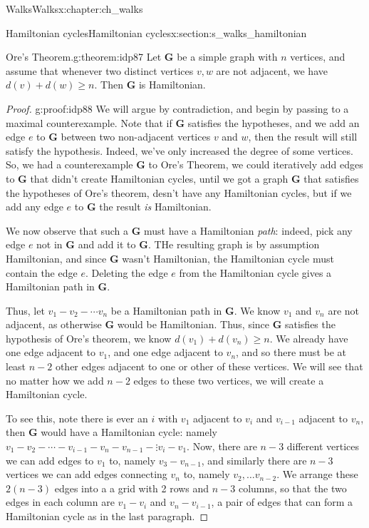 \documentclass[oneside,10pt,]{book}
\numberwithin{equation}{section}
\newcommand{\bfG}{\mathbf{G}}
\begin{document}
\begin{chapterptx}{Walks}{}{Walks}{}{}{x:chapter:ch_walks}
\begin{sectionptx}{Hamiltonian cycles}{}{Hamiltonian cycles}{}{}{x:section:s_walks_hamiltonian}
\begin{theorem}{Ore's Theorem.}{}{g:theorem:idp87}%
Let \(\bfG\) be a simple graph with \(n\) vertices, and assume that whenever two distinct vertices \(v,w\) are not adjacent, we have \(d(v)+d(w)\geq n\).  Then \(\bfG\) is Hamiltonian.%
\end{theorem}
\begin{proof}{}{g:proof:idp88}
We will argue by contradiction, and begin by passing to a maximal counterexample.  Note that if \(\bfG\) satisfies the hypotheses, and we add an edge \(e\) to \(\bfG\) between two non-adjacent vertices \(v\) and \(w\), then the result will still satisfy the hypothesis.  Indeed, we've only increased the degree of some vertices.  So, we had a counterexample \(\bfG\) to Ore's Theorem, we could iteratively add edges to \(\bfG\) that didn't create Hamiltonian cycles, until we got a graph \(\bfG\) that satisfies the hypotheses of Ore's theorem, desn't have any Hamiltonian cycles, but if we add any edge \(e\) to \(\bfG\) the result \emph{is} Hamiltonian.%
\par
We now observe that such a \(\bfG\) must have a Hamiltonian \emph{path}: indeed, pick any edge \(e\) not in \(\bfG\) and add it to \(\bfG\).  THe resulting graph is by assumption Hamiltonian, and since \(\bfG\) wasn't Hamiltonian, the Hamiltonian cycle must contain the edge \(e\).  Deleting the edge \(e\) from the Hamiltonian cycle gives a Hamiltonian path in \(\bfG\).%
\par
Thus, let \(v_1-v_2-\cdots v_n\) be a Hamiltonian path in \(\bfG\).  We know \(v_1\) and \(v_n\) are not adjacent, as otherwise \(\bfG\) would be Hamiltonian.  Thus, since \(\bfG\) satisfies the hypothesis of Ore's theorem,  we know \(d(v_1)+d(v_n)\geq n\).  We already have one edge adjacent to \(v_1\), and one edge adjacent to \(v_n\), and so there must be at least \(n-2\) other edges adjacent to one or other of these vertices.  We will see that no matter how we add \(n-2\) edges to these two vertices, we will create a Hamiltonian cycle.%
\par
To see this, note there is ever an \(i\) with \(v_1\) adjacent to \(v_i\) and \(v_{i-1}\) adjacent to \(v_n\), then \(\bfG\) would have a Hamiltonian cycle: namely \(v_1-v_2-\cdots-v_{i-1}-v_n-v_{n-1}-\vdots v_i-v_1\).  Now, there are \(n-3\) different vertices we can add edges to \(v_1\) to, namely \(v_3-v_{n-1}\), and similarly there are \(n-3\) vertices we can add edges connecting \(v_n\) to, namely \(v_2, \dots v_{n-2}\).  We arrange these \(2(n-3)\) edges into a a grid with 2 rows and \(n-3\) columns, so that the two edges in each column are \(v_1-v_i\) and \(v_n-v_{i-1}\), a pair of edges that can form a Hamiltonian cycle as in the last paragraph.%

\end{proof}
\end{sectionptx}
\end{chapterptx}
\end{document}
